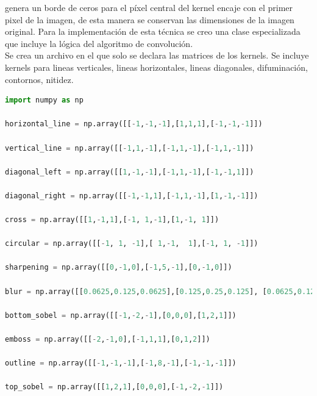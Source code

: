 \documentclass{article}
\begin{document}
genera un borde de ceros para el píxel central del kernel encaje con el primer pixel de la imagen, de esta manera se conservan las dimensiones de la imagen original.
Para la implementación de esta técnica se creo una clase especializada que incluye la lógica del algoritmo de convolución. \\
Se crea un archivo en el que solo se declara las matrices de los kernels. Se incluye kernels para lineas verticales, lineas horizontales, lineas diagonales, difuminación, contornos, nitidez. \\
\begin{lstlisting}[language=python]
import numpy as np

horizontal_line = np.array([[-1,-1,-1],[1,1,1],[-1,-1,-1]])

vertical_line = np.array([[-1,1,-1],[-1,1,-1],[-1,1,-1]])

diagonal_left = np.array([[1,-1,-1],[-1,1,-1],[-1,-1,1]])

diagonal_right = np.array([[-1,-1,1],[-1,1,-1],[1,-1,-1]])

cross = np.array([[1,-1,1],[-1, 1,-1],[1,-1, 1]])

circular = np.array([[-1, 1, -1],[ 1,-1,  1],[-1, 1, -1]])

sharpening = np.array([[0,-1,0],[-1,5,-1],[0,-1,0]])

blur = np.array([[0.0625,0.125,0.0625],[0.125,0.25,0.125], [0.0625,0.125,0.0625]])

bottom_sobel = np.array([[-1,-2,-1],[0,0,0],[1,2,1]])

emboss = np.array([[-2,-1,0],[-1,1,1],[0,1,2]])

outline = np.array([[-1,-1,-1],[-1,8,-1],[-1,-1,-1]])

top_sobel = np.array([[1,2,1],[0,0,0],[-1,-2,-1]])

\end{lstlisting}
\end{document}
